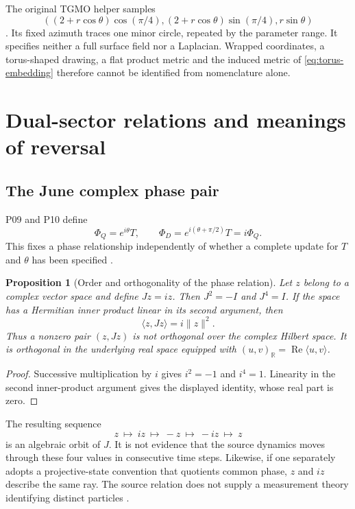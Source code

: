 \documentclass[11pt,a4paper]{article}
\newtheorem{proposition}[theorem]{Proposition}
\theoremstyle{definition}
\newcommand{\R}{\mathbb R}
\DeclareMathOperator{\Rea}{Re}
\numberwithin{equation}{section}
\begin{document}
The original TGMO helper samples
\begin{equation}
 ((2+r\cos\theta)\cos(\pi/4),
 (2+r\cos\theta)\sin(\pi/4),r\sin\theta)
 \label{eq:minor-circle}
\end{equation}
\cite[lines 5--14]{TGMO}.
Its fixed azimuth traces one minor circle, repeated by the parameter range.
It specifies neither a full surface field nor a Laplacian.
Wrapped coordinates, a torus-shaped drawing, a flat product metric and
the induced metric of \eqref{eq:torus-embedding} therefore cannot be
identified from nomenclature alone.


\section{Dual-sector relations and meanings of reversal}\label{sec:sectors}
\subsection{The June complex phase pair}

P09 and P10 define
\begin{equation}
 \Phi_Q=e^{i\theta}T,\qquad
 \Phi_D=e^{i(\theta+\pi/2)}T=i\Phi_Q.
 \label{eq:phase-pair}
\end{equation}
This fixes a phase relationship independently of whether a complete update
for $T$ and $\theta$ has been specified
\cite[physical p.~2, \S2.3]{P09} \cite[physical p.~2, \S2.3]{P10}.

\begin{proposition}[Order and orthogonality of the phase relation]
Let $z$ belong to a complex vector space and define $Jz=iz$. Then
$J^2=-I$ and $J^4=I$. If the space has a Hermitian inner product linear in
its second argument, then
\begin{equation}
 \langle z,Jz\rangle=i\lVert z\rVert^2.
\end{equation}
Thus a nonzero pair $(z,Jz)$ is not orthogonal over the complex Hilbert
space. It is orthogonal in the underlying real space equipped with
$(u,v)_{\R}=\Rea\langle u,v\rangle$.
\end{proposition}

\begin{proof}
Successive multiplication by $i$ gives $i^2=-1$ and $i^4=1$.
Linearity in the second inner-product argument gives the displayed identity,
whose real part is zero.
\end{proof}

The resulting sequence
\begin{equation}
 z\ \longmapsto\ iz\ \longmapsto\ -z\ \longmapsto\ -iz
 \ \longmapsto\ z
 \label{eq:quarter-cycle}
\end{equation}
is an algebraic orbit of $J$. It is not evidence that the source dynamics
moves through these four values in consecutive time steps. Likewise, if one
separately adopts a projective-state convention that quotients common phase,
$z$ and $iz$ describe the same ray. The source relation does not supply a
measurement theory identifying distinct particles \cite[\S6.1]{F01}.
\end{document}
